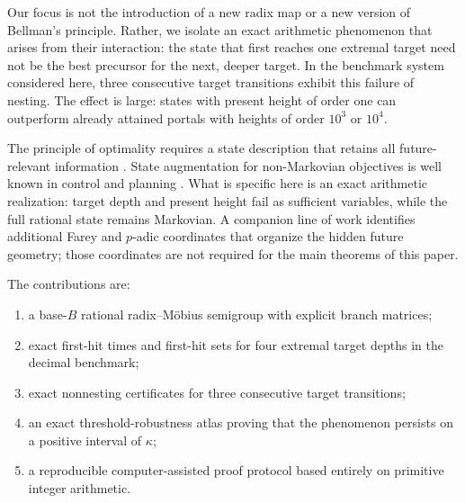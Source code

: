 \documentclass[11pt]{amsart}
\theoremstyle{definition}
\begin{document}
Our focus is not the introduction of a new radix map or a new version of Bellman's principle.  Rather, we isolate an exact arithmetic phenomenon that arises from their interaction: the state that first reaches one extremal target need not be the best precursor for the next, deeper target.  In the benchmark system considered here, three consecutive target transitions exhibit this failure of nesting.  The effect is large: states with present height of order one can outperform already attained portals with heights of order $10^3$ or $10^4$.

The principle of optimality requires a state description that retains all future-relevant information \cite{Bellman1952On,Light2023The}.  State augmentation for non-Markovian objectives is well known in control and planning \cite{Brafman2017Specifying,Jones2021A}.  What is specific here is an exact arithmetic realization: target depth and present height fail as sufficient variables, while the full rational state remains Markovian.  A companion line of work identifies additional Farey and $p$-adic coordinates that organize the hidden future geometry; those coordinates are not required for the main theorems of this paper.

The contributions are:
\begin{enumerate}
\item a base-$B$ rational radix--M\"obius semigroup with explicit branch matrices;
\item exact first-hit times and first-hit sets for four extremal target depths in the decimal benchmark;
\item exact nonnesting certificates for three consecutive target transitions;
\item an exact threshold-robustness atlas proving that the phenomenon persists on a positive interval of $\kappa$;
\item a reproducible computer-assisted proof protocol based entirely on primitive integer arithmetic.
\end{enumerate}
\end{document}

